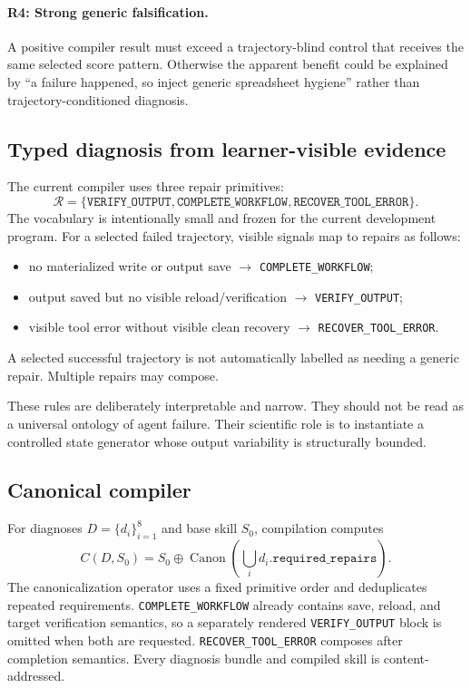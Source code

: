 \paragraph{R4: Strong generic falsification.}
A positive compiler result must exceed a trajectory-blind control that receives the same selected score pattern. Otherwise the apparent benefit could be explained by ``a failure happened, so inject generic spreadsheet hygiene'' rather than trajectory-conditioned diagnosis.

\subsection{Typed diagnosis from learner-visible evidence}
The current compiler uses three repair primitives:
\begin{equation}
\mathcal{R}=\{\texttt{VERIFY\_OUTPUT},\texttt{COMPLETE\_WORKFLOW},\texttt{RECOVER\_TOOL\_ERROR}\}.
\end{equation}
The vocabulary is intentionally small and frozen for the current development program. For a selected failed trajectory, visible signals map to repairs as follows:
\begin{itemize}
    \item no materialized write or output save $\rightarrow$ \texttt{COMPLETE\_WORKFLOW};
    \item output saved but no visible reload/verification $\rightarrow$ \texttt{VERIFY\_OUTPUT};
    \item visible tool error without visible clean recovery $\rightarrow$ \texttt{RECOVER\_TOOL\_ERROR}.
\end{itemize}
A selected successful trajectory is not automatically labelled as needing a generic repair. Multiple repairs may compose.

These rules are deliberately interpretable and narrow. They should not be read as a universal ontology of agent failure. Their scientific role is to instantiate a controlled state generator whose output variability is structurally bounded.

\subsection{Canonical compiler}
For diagnoses $D=\{d_i\}_{i=1}^{8}$ and base skill $S_0$, compilation computes
\begin{equation}
C(D,S_0)=S_0\oplus \operatorname{Canon}\!\left(\bigcup_i d_i.\texttt{required\_repairs}\right).
\end{equation}
The canonicalization operator uses a fixed primitive order and deduplicates repeated requirements. \texttt{COMPLETE\_WORKFLOW} already contains save, reload, and target verification semantics, so a separately rendered \texttt{VERIFY\_OUTPUT} block is omitted when both are requested. \texttt{RECOVER\_TOOL\_ERROR} composes after completion semantics. Every diagnosis bundle and compiled skill is content-addressed.

